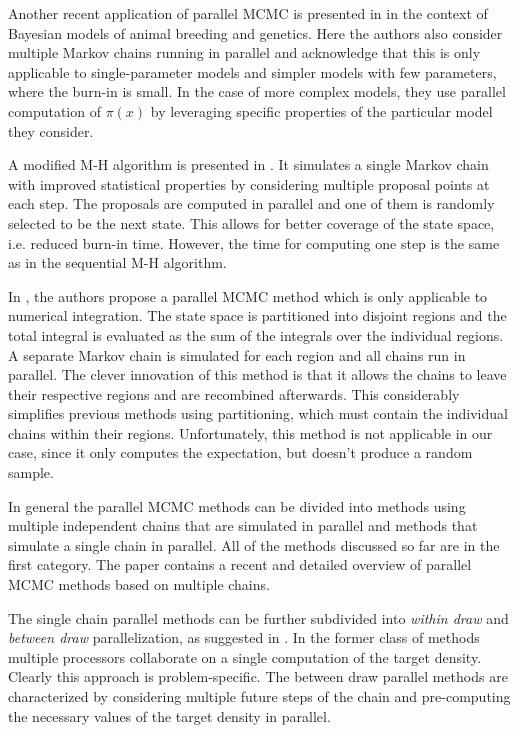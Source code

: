 \documentclass[11pt,letterpaper]{article}       %
\begin{document}
Another recent application of parallel MCMC is presented in
\cite{wu2012parallel} in the context of Bayesian models of animal breeding and
genetics.  Here the authors also consider multiple Markov chains running in
parallel and acknowledge that this is only applicable to single-parameter
models and simpler models with few parameters, where the burn-in is small.  In
the case of more complex models, they use parallel computation of $\pi(x)$ by
leveraging specific properties of the particular model they consider.

A modified M-H algorithm is presented in \cite{miller2010markov}.  It simulates
a single Markov chain with improved  statistical properties by considering
multiple proposal points at each step.  The proposals are computed in  parallel
and one of them is randomly selected to be the next state.  This allows for
better coverage of the state space, i.e. reduced burn-in time.  However, the
time for computing one step is the same as in the sequential 
M-H algorithm.


In \cite{vanderwerken2013parallel}, the authors propose a parallel MCMC method
which is only applicable to numerical integration.  The state space is
partitioned into disjoint regions and the total integral is evaluated as the
sum of the integrals over the individual regions. A separate Markov chain is
simulated for each region and all chains run in parallel.  The clever
innovation of this method is that it allows the chains to leave their
respective regions and are recombined afterwards.  This considerably simplifies
previous methods using partitioning, which must contain the individual chains
within their regions.  Unfortunately, this method is not applicable in our
case, since it only computes the expectation, but doesn't produce a random
sample.

In general the parallel MCMC methods can be divided into methods using multiple
independent chains that are simulated in parallel and methods that simulate a
single chain in parallel.  All of the methods discussed so far are in the first
category.  The paper \cite{guo2012parallel} contains a recent and detailed
overview of parallel MCMC methods based on multiple chains.

The single chain parallel methods can be further subdivided into \emph{within
draw} and \emph{between draw} parallelization, as suggested in
\cite{strid2010efficient}.  In the former class of methods multiple processors
collaborate on a single computation of the target density.  Clearly this
approach is problem-specific.  The between draw parallel methods are
characterized by considering multiple future steps of the chain and
pre-computing the necessary values of the target density in parallel. 
\end{document}
